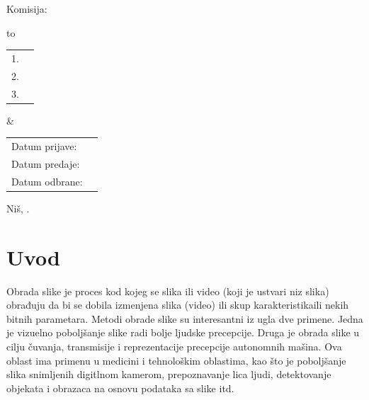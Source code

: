 \documentclass[a4paper,12pt,titlepage]{article}
\begin{document}
\begin{titlepage}
    \vspace{1cm}
   
   \noindent
    Komisija:
    
    \vspace{0.1cm}
    
    \noindent
    \begin{tabu} to   
         \begin{tabular}{@{}ll}
            1. & \underline{\hspace{6.5cm}}\\
            2. & \underline{\hspace{6.5cm}}\\
            3. & \underline{\hspace{6.5cm}}
        \end{tabular}  
        
    &
   
        \begin{tabular}{ll@{}}
            Datum prijave: & \underline{\hspace{3cm}}\\
            Datum predaje: & \underline{\hspace{3cm}}\\
            Datum odbrane: & \underline{\hspace{3cm}}
        \end{tabular}
  
    \end{tabu}
    
    \vspace{4cm}
    
     \begin{center}
        Niš, \the\year.
    \end{center}
\end{titlepage}

\tableofcontents

\setlength{\parskip}{\baselineskip}%
\setlength{\parindent}{15pt}%

\thispagestyle{empty}
\newpage


\section{Uvod}%

Obrada slike je proces kod kojeg se slika ili video (koji je ustvari niz slika) obrađuju da bi se dobila izmenjena slika (video) ili skup karakteristikaili nekih bitnih parametara. Metodi obrade slike su interesantni iz ugla dve primene. Jedna je vizuelno poboljšanje slike radi bolje ljudske precepcije. Druga je obrada slike u cilju čuvanja, transmisije i reprezentacije precepcije autonomnih mašina. Ova oblast ima primenu u medicini i tehnološkim oblastima, kao što je poboljšanje slika snimljenih digitlnom kamerom, prepoznavanje lica ljudi, detektovanje objekata i obrazaca na osnovu podataka sa slike itd. 
\end{document}
